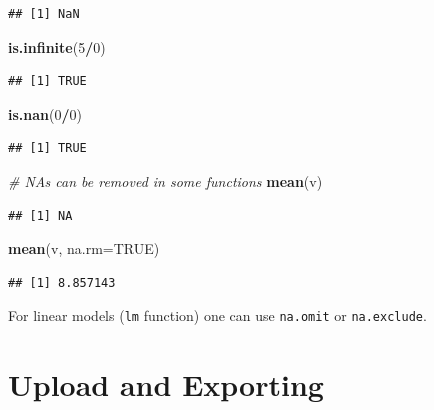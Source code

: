 \documentclass[
]{article}
\newenvironment{Shaded}{\begin{snugshade}}{\end{snugshade}}
\newcommand{\CommentTok}[1]{\textcolor[rgb]{0.56,0.35,0.01}{\textit{#1}}}
\newcommand{\DataTypeTok}[1]{\textcolor[rgb]{0.13,0.29,0.53}{#1}}
\newcommand{\DecValTok}[1]{\textcolor[rgb]{0.00,0.00,0.81}{#1}}
\newcommand{\KeywordTok}[1]{\textcolor[rgb]{0.13,0.29,0.53}{\textbf{#1}}}
\newcommand{\NormalTok}[1]{#1}
\newcommand{\OperatorTok}[1]{\textcolor[rgb]{0.81,0.36,0.00}{\textbf{#1}}}
\newcommand{\OtherTok}[1]{\textcolor[rgb]{0.56,0.35,0.01}{#1}}
\begin{document}
\begin{verbatim}
## [1] NaN
\end{verbatim}

\begin{Shaded}
\begin{Highlighting}[]
\KeywordTok{is.infinite}\NormalTok{(}\DecValTok{5}\OperatorTok{/}\DecValTok{0}\NormalTok{)}
\end{Highlighting}
\end{Shaded}

\begin{verbatim}
## [1] TRUE
\end{verbatim}

\begin{Shaded}
\begin{Highlighting}[]
\KeywordTok{is.nan}\NormalTok{(}\DecValTok{0}\OperatorTok{/}\DecValTok{0}\NormalTok{)}
\end{Highlighting}
\end{Shaded}

\begin{verbatim}
## [1] TRUE
\end{verbatim}

\begin{Shaded}
\begin{Highlighting}[]
\CommentTok{# NAs can be removed in some functions}
\KeywordTok{mean}\NormalTok{(v)}
\end{Highlighting}
\end{Shaded}

\begin{verbatim}
## [1] NA
\end{verbatim}

\begin{Shaded}
\begin{Highlighting}[]
\KeywordTok{mean}\NormalTok{(v, }\DataTypeTok{na.rm=}\OtherTok{TRUE}\NormalTok{)}
\end{Highlighting}
\end{Shaded}

\begin{verbatim}
## [1] 8.857143
\end{verbatim}

For linear models (\texttt{lm} function) one can use \texttt{na.omit} or
\texttt{na.exclude}.

\hypertarget{upload-and-exporting}{%
\section{Upload and Exporting}\label{upload-and-exporting}}
\end{document}
